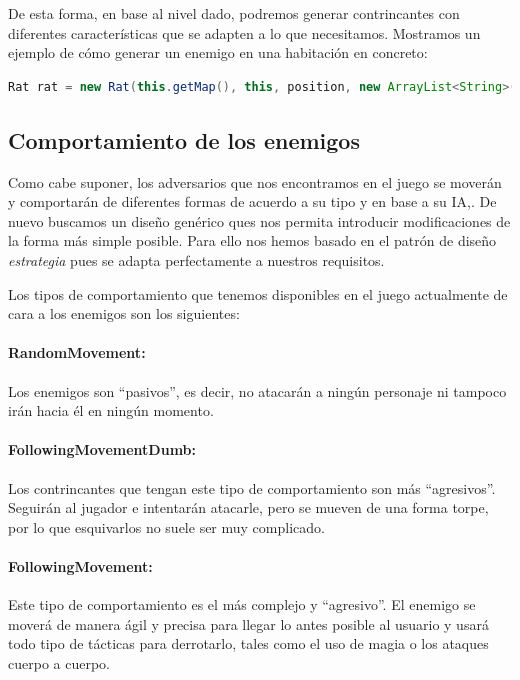 De esta forma, en base al nivel dado, podremos generar contrincantes con diferentes características que se adapten a lo que necesitamos. Mostramos un ejemplo de cómo generar un enemigo en una habitación en concreto:

\begin{lstlisting}[language=java]
Rat rat = new Rat(this.getMap(), this, position, new ArrayList<String>(), level);
\end{lstlisting}

\subsection{Comportamiento de los enemigos}
\label{sec:ia}

Como cabe suponer, los adversarios que nos encontramos en el juego se moverán y comportarán de diferentes formas de acuerdo a su tipo y en base a su IA,\cite{Schwab2009a}. De nuevo buscamos un diseño genérico ques nos permita introducir modificaciones de la forma más simple posible.
Para ello nos hemos basado en el patrón de diseño \textit{estrategia} pues se adapta perfectamente a nuestros requisitos.

Los tipos de comportamiento que tenemos disponibles en el juego actualmente de cara a los enemigos son los siguientes:

\paragraph{RandomMovement:} Los enemigos son ``pasivos'', es decir, no atacarán a ningún personaje ni tampoco irán hacia él en ningún momento.

\paragraph{FollowingMovementDumb:} Los contrincantes que tengan este tipo de comportamiento son más ``agresivos''. Seguirán al jugador e intentarán atacarle, pero se mueven de una forma torpe, por lo que esquivarlos no suele ser muy complicado.

\paragraph{FollowingMovement:} Este tipo de comportamiento es el más complejo y ``agresivo''. El enemigo se moverá de manera ágil y precisa para llegar lo antes posible al usuario y usará todo tipo de tácticas para derrotarlo, tales como el uso de magia o los ataques cuerpo a cuerpo.

